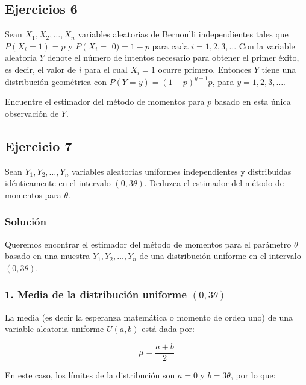 \documentclass[
]{article}
\begin{document}
\subsection{Ejercicios 6}\label{ejercicios-6}

Sean \(X_{1}, X_{2}, \ldots, X_{n}\) variables aleatorias de Bernoulli independientes tales que \(P\left(X_{i}=1\right)=p\) y \(P\left(X_{i}=\right.\) \(0)=1-p\) para cada \(i=1,2,3, \ldots\) Con la variable aleatoria \(Y\) denote el número de intentos necesario para obtener el primer éxito, es decir, el valor de \(i\) para el cual \(X_{i}=1\) ocurre primero. Entonces \(Y\) tiene una distribución geométrica con \(P(Y=y)=(1-p)^{y-1} p\), para \(y=1,2,3, \ldots\).

Encuentre el estimador del método de momentos para \(p\) basado en esta única observación de \(Y\).

\subsection{Ejercicio 7}\label{ejercicio-7-2}

Sean \(Y_{1}, Y_{2}, \ldots, Y_{n}\) variables aleatorias uniformes independientes y distribuidas idénticamente en el intervalo \((0,3 \theta)\). Deduzca el estimador del método de momentos para \(\theta\).

\subsubsection{Solución}\label{soluciuxf3n-14}

Queremos encontrar el estimador del método de momentos para el parámetro \(\theta\) basado en una muestra \(Y_1, Y_2, \ldots, Y_n\) de una distribución uniforme en el intervalo \((0, 3\theta)\).

\subsubsection{\texorpdfstring{1. Media de la distribución uniforme \((0, 3\theta)\)}{1. Media de la distribución uniforme (0, 3\textbackslash theta)}}\label{media-de-la-distribuciuxf3n-uniforme-0-3theta}

La media (es decir la esperanza matemática o momento de orden uno) de una variable aleatoria uniforme \(U(a, b)\) está dada por:

\[
\mu = \frac{a + b}{2}
\]

En este caso, los límites de la distribución son \(a = 0\) y \(b = 3\theta\), por lo que:
\end{document}
